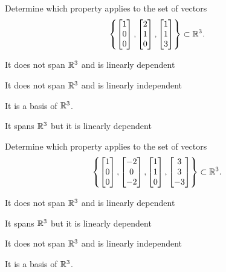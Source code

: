 \begin{readinessAssuranceTest}
\item Determine which property applies to the set of vectors $$\left\{ \begin{bmatrix}  1 \\ 0 \\ 0 \end{bmatrix}, \begin{bmatrix} 2 \\ 1 \\ 0 \end{bmatrix} , \begin{bmatrix} 1 \\ 1 \\ 3 \end{bmatrix} \right\}\subset \mathbb{R}^3.$$
\begin{readinessAssuranceTestChoices}
\item It does not span \(\mathbb{R}^3\) and is linearly dependent
\item It does not span \(\mathbb{R}^3\) and is linearly independent
\item It is a basis of \(\mathbb{R}^3\). %
\item It spans \(\mathbb{R}^3\) but it is linearly dependent
\end{readinessAssuranceTestChoices}


\item Determine which property applies to the set of vectors $$\left\{ \begin{bmatrix}  1 \\ 0 \\ 0 \end{bmatrix}, \begin{bmatrix} -2 \\ 0 \\ -2 \end{bmatrix} , \begin{bmatrix} 1 \\ 1 \\ 0 \end{bmatrix} , \begin{bmatrix} 3 \\ 3 \\ -3 \end{bmatrix}\right\}\subset \mathbb{R}^3.$$
\begin{readinessAssuranceTestChoices}
\item It does not span \(\mathbb{R}^3\) and is linearly dependent
\item It spans \(\mathbb{R}^3\) but it is linearly dependent %
\item It does not span \(\mathbb{R}^3\) and is linearly independent
\item It is a basis of \(\mathbb{R}^3\).
\end{readinessAssuranceTestChoices}



\end{readinessAssuranceTest}
